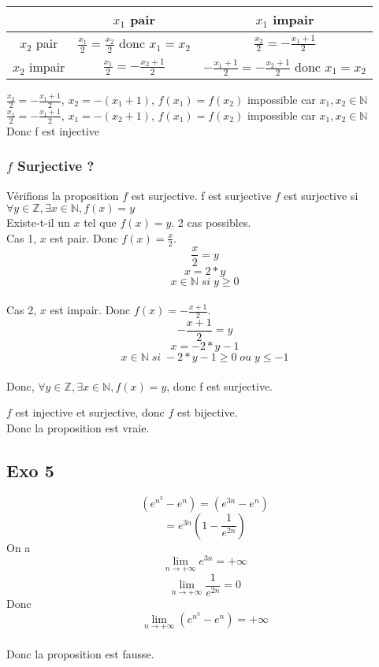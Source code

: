 \documentclass[]{book}
\theoremstyle{definition}
\begin{document}
\begin{center}
\begin{tabular}{c|c|c} 
                                  & $x_1$ pair & $x_1$ impair\\
      \hline
     $x_2$ pair   & $\frac{x_1}{2} = \frac{x_2}{2}$ donc $x_1=x_2$ & $\frac{x_2}{2} = -\frac{x_1+1}{2}$ \\
      \hline
     $x_2$ impair  & $\frac{x_1}{2} = -\frac{x_2+1}{2}$ & $-\frac{x_1+1}{2} = -\frac{x_2+1}{2}$ donc $x_1=x_2$\\
\end{tabular}
\end{center}



$\frac{x_2}{2} = -\frac{x_1+1}{2}$, $x_2 = -(x_1+1)$, $f(x_1) = f(x_2)$ impossible car $x_1, x_2 \in \mathbb{N}$ 
\\
$\frac{x_1}{2} = -\frac{x_1+1}{2}$, $x_1 = -(x_2+1)$, $f(x_1) = f(x_2)$ impossible car $x_1, x_2 \in \mathbb{N}$ 
\\ 
Donc f est injective

\subsubsection*{$f$ Surjective ?}
V\'erifions la proposition $f$ est surjective. f est surjective
$f$ est surjective si $\forall y \in \mathbb{Z}, \exists x \in \mathbb{N}, f(x) = y$
\\
Existe-t-il un $x$ tel que $f(x) = y$. 2 cas possibles.
\\
Cas 1, $x$ est pair. Donc $f(x) = \frac{x}{2}$.
$$\frac{x}{2} = y$$
$$x = 2*y$$
$$x \in \mathbb{N} \; si\; y \geq 0$$
\\
Cas 2, $x$ est impair. Donc $f(x) = -\frac{x+1}{2}$.
$$-\frac{x+1}{2} = y$$
$$x = -2*y -1$$
$$x \in \mathbb{N} \; si \; -2*y -1 \geq 0 \; ou \; y \leq -1$$
\\
Donc, $\forall y \in \mathbb{Z}, \exists x \in \mathbb{N}, f(x) = y$, donc f est surjective.


$f$ est injective et surjective, donc $f$ est bijective.
\\ 
 Donc la proposition est vraie.


\subsection*{Exo 5}
$$(e^{n^{3}} - e^{n}) = (e^{3n} - e^{n})$$
$$= e^{3n} (1 - \frac{1}{e^{2n}})$$
On a 
$$\lim_{n \to + \infty} e^{3n}  = + \infty$$
$$\lim_{n \to + \infty} \frac{1}{e^{2n}} = 0$$
Donc
$$\lim_{n \to + \infty} (e^{n^{3}} - e^{n}) = + \infty$$
\\ 
Donc la proposition est fausse.
\end{document}
